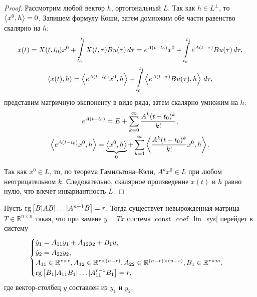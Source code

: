 \begin{proof}
  Рассмотрим любой вектор $h$, ортогональный $L$. Так как $h \in L^\perp$, то
  $\left<x^0,h\right> = 0$. Запишем формулу Коши, затем домножим обе части равенство скалярно на $h$:
  \begin{gather*}
    x(t) = X(t, t_0) x^0 + \int\limits_{t_0}^{t_1} X(t, \tau) B u(\tau)\,d\tau =
      e^{A(t - t_0)} x^0 + \int\limits_{t_0}^{t_1} e^{A(t - \tau)} B u(\tau)\,d\tau,\\
    \left<x(t),h\right> = \left<e^{A(t - t_0)} x^0,h\right> +
      \int\limits_{t_0}^{t_1} \left<e^{A(t - \tau)} B u(\tau),h\right>\,d\tau,
  \end{gather*}
  представим матричную экспоненту в виде ряда, затем скалярно умножим на $h$:
  \begin{gather*}
    e^{A(t - t_0)} = E + \sum\limits_{k = 0}^\infty \frac{A^k (t - t_0)^k}{k!},\\
    \left<e^{A(t - t_0)} x^0,h\right> =
      \underbrace{\left<x^0,h\right>}_{0} + \sum\limits_{k = 1}^\infty \left<\frac{A^k (t - t_0)^k}{k!} x^0,h\right>.
  \end{gather*}
  
  Так как $x^0 \in L$, то, по теорема Гамильтона--Кэли, $A^k x^0 \in L$ при любом неотрицательном $k$.
  Следовательно, скалярное произведение $x(t)$ и $h$ равно нулю, что влечет инвариантность $L$.
\end{proof}

\begin{theorem}[О декомпозиции]
  Пусть $\operatorname{rg} \left[ B | A B | \ldots | A^{n - 1} B \right] = r$. Тогда существует невырожденная матрица
  $T \in \mathbb{R}^{n \times n}$ такая, что при замене $y = T x$ система \eqref{const_coef_lin_sys}
  перейдет в систему
  \begin{equation*}
    \begin{cases}
      \dot{y}_1 = A_{11} y_1 + A_{12} y_2 + B_1 u,\\
      \dot{y}_2 = A_{22} y_2,\\
      A_{11} \in \mathbb{R}^{r \times r}, A_{12} \in \mathbb{R}^{r \times (n - r)},
      A_{22} \in \mathbb{R}^{(n - r) \times (n - r)},
      B_1 \in \mathbb{R}^{r \times m},\\
      \operatorname{rg} \left[ B_1 | A_{11} B_1 | \ldots | A_{11}^{r - 1} B_1 \right] = r,
    \end{cases}
  \end{equation*}
  где вектор-столбец $y$ составлен из $y_1$ и $y_2$.
\end{theorem}

